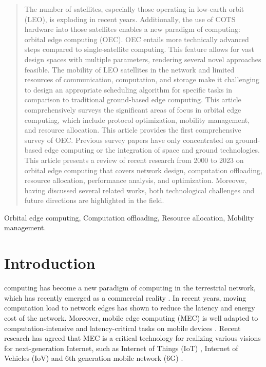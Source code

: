 \documentclass[lettersize,journal]{IEEEtran}
\begin{document}
\begin{abstract}

The number of satellites, especially those operating in low-earth orbit (LEO), is exploding in recent years. Additionally, the use of COTS hardware into those satellites enables a new paradigm of computing: orbital edge computing (OEC). OEC entails more technically advanced steps compared to single-satellite computing. This feature allows for vast design spaces with multiple parameters, rendering several novel approaches feasible. The mobility of LEO satellites in the network and limited resources of communication, computation, and storage make it challenging to design an appropriate scheduling algorithm for specific tasks in comparison to traditional ground-based edge computing. This article comprehensively surveys the significant areas of focus in orbital edge computing, which include protocol optimization, mobility management, and resource allocation. This article provides the first comprehensive survey of OEC. Previous survey papers have only concentrated on ground-based edge computing or the integration of space and ground technologies. This article presents a review of recent research from 2000 to 2023 on orbital edge computing that covers network design, computation offloading, resource allocation, performance analysis, and optimization. Moreover, having discussed several related works, both technological challenges and future directions are highlighted in the field.
\end{abstract}

\begin{IEEEkeywords}
Orbital edge computing, Computation offloading, Resource allocation, Mobility management.
\end{IEEEkeywords}

\section{Introduction}
\label{sec1}
 computing has become a new paradigm of computing in the terrestrial network, which has recently emerged as a commercial reality \cite{RN143}. In recent years, moving computation load to network edges has shown to reduce the latency and energy cost of the network. Moreover, mobile edge computing (MEC) is well adapted to computation-intensive and latency-critical tasks on mobile devices \cite{SN1}. Recent research has agreed that MEC is a critical technology for realizing various visions for next-generation Internet, such as Internet of Things (IoT) \cite{RN141}, Internet of Vehicles (IoV) \cite{RN257,RN72} and 6th generation mobile network (6G) \cite{RN142}. 
\end{document}
